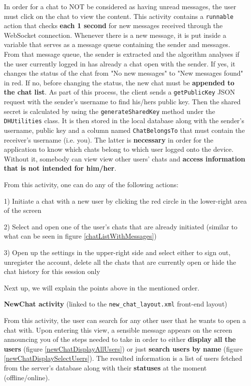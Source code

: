 In order for a chat to NOT be considered as having unread messages, the user must click on the chat to view the content. This activity contains a \verb|runnable| action that checks \textbf{each 1 second} for new messages received through the WebSocket connection. Whenever there is a new message, it is put inside a variable that serves as a message queue containing the sender and messages. From that message queue, the sender is extracted and the algorithm analyses if the user currently logged in has already a chat open with the sender. If yes, it changes the status of the chat from "No new messages" to "New messages found" in red. If no, before changing the status, the new chat must be \textbf{appended to the chat list}. As part of this process, the client sends a \verb|getPublicKey| JSON request with the sender's username to find his/hers public key. Then the shared secret is calculated by using the \verb|generateSharedKey| method under the \verb|DHUtilities| class. It is then stored in the local database along with the sender's username, public key and a column named \verb|ChatBelongsTo| that must contain the receiver's username (i.e. you). The latter is \textbf{necessary} in order for the application to know which chats belong to which user logged onto the device. Without it, somebody can view view other users' chats and \textbf{access information that is not intended for him/her}.

From this activity, one can do any of the following actions:

1) Initiate a chat with a new user by clicking the red circle in the lower-right area of the screen

2) Select and open one of the user's chats that are already initiated (similar to what can be seen in figure \ref{chatListWithMessages})

3) Open up the settings in the upper-right side and select either to sign out, unregister the account, delete all the chats that are currently open or hide the chat history for this session only

Next up, we will explain the points above in the mentioned order.

\textbf{NewChat activity} (linked to the \verb|new_chat_layout.xml| front-end layout)

From this activity, the user can search for any other user that he wants to open a chat with. Upon entering this view, a sensible message appears on the screen announcing you of the steps needed to take in order to either \textbf{display all the users} (figure \ref{newChatDisplayAllUsers}) or just \textbf{search users by name} (figure \ref{newChatDisplaySelectUsers}). The resulted information is a list of users fetched from the server's database along with their \textbf{statuses} at the moment (offline/online). 


